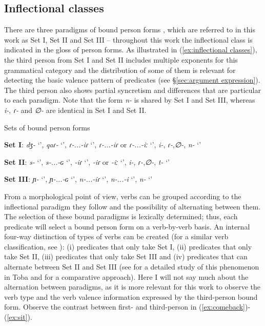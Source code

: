 \documentclass[12pt]{article}
\begin{document}


\subsection{Inflectional classes}\label{sec:inflection-classes}
 There are three paradigms of bound person forms \citep[in the sense of][]{Haspelmath2013}, which are referred to in this work as Set I, Set II and Set III -- throughout this work the inflectional class is indicated in the gloss of person forms. As illustrated in (\ref{ex:inflectional classes}), the third person from Set I and Set II includes multiple exponents for this grammatical category and  the distribution of some of them is relevant for detecting the basic valence pattern of predicates (see \S \ref{sec:argument expression}). The third person also shows partial syncretism and differences that are particular to each paradigm. Note that the form \textit{n-} is shared by Set I and Set III, whereas \textit{i-}, \textit{ɾ-} and \textit{∅-} are identical in Set I and Set II. 
 
\begin{exe}
\ex Sets of bound person forms \label{ex:inflectional classes}
\begin{xlist}
\ex 
 \textbf{Set I}: \textit{dʒ-} `\First\Sg', \textit{qaɾ-} `\First\Pl', \textit{ɾ-...-iɾ} `\Second\Sg', \textit{ɾ-...-iɾ} or \textit{ɾ-...-iː} `\Second\Pl', \textit{i-}, \textit{ɾ-},\textit{∅-}, \textit{n-} `\Third' 

\ex
\textbf{Set II}: \textit{s-} `\First\Sg', \textit{s-...-ɢ} `\First\Pl', \textit{-iɾ} `\Second\Sg', \textit{-iɾ} or \textit{-iː} `\Second\Pl', \textit{i-}, \textit{ɾ-},\textit{∅-}, \textit{t-} `\Third'

\ex
 \textbf{Set III}: \textit{ɲ-} `\First\Sg', \textit{ɲ-...-ɢ} `\First\Pl', \textit{n-...-iɾ} `\Second\Sg', \textit{n-...-i} `\Second\Pl',  \textit{n-} `\Third' 
\end{xlist}
\end{exe}


From a morphological point of view, verbs can be grouped according to the inflectional paradigm they follow and the possibility of alternating between them. The selection of these bound paradigms is lexically determined; thus, each predicate will select a bound person form on a verb-by-verb basis. An internal four-way distinction of types of verbs can be created (for a similar verb classification, see \citet[][96--116]{grondona1998}): (i) predicates that only take Set I, (ii) predicates that only take Set II, (iii) predicates that only take Set III and (iv) predicates that can alternate between Set II and Set III (see \citet{Zurlo2016b} for a detailed study of this phenomenon in Toba and \citet{walker.vanlier2026} for a comparative approach). Here I will not say much about the alternation between paradigms, as it is more relevant for this work to observe the verb type and the verb valence information expressed by the third-person bound form. Observe the contrast between first- and third-person in (\ref{ex:comeback})-(\ref{ex:sit}). 
\end{document}
